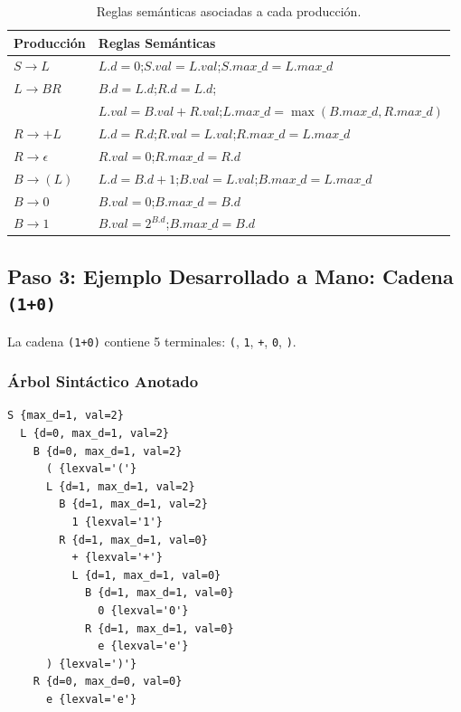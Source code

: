 \documentclass[11pt,a4paper]{article}
\begin{document}
\begin{table}[h!]
\centering
\begin{tabular}{ll}
\toprule
\textbf{Producción} & \textbf{Reglas Semánticas} \\
\midrule
$S \rightarrow L$ & $L.d = 0$;\quad $S.val = L.val$;\quad $S.max\_d = L.max\_d$ \\
\addlinespace
$L \rightarrow B R$ & $B.d = L.d$;\quad $R.d = L.d$; \\
& $L.val = B.val + R.val$;\quad $L.max\_d = \max(B.max\_d, R.max\_d)$ \\
\addlinespace
$R \rightarrow + L$ & $L.d = R.d$;\quad $R.val = L.val$;\quad $R.max\_d = L.max\_d$ \\
\addlinespace
$R \rightarrow \epsilon$ & $R.val = 0$;\quad $R.max\_d = R.d$ \\
\addlinespace
$B \rightarrow ( L )$ & $L.d = B.d + 1$;\quad $B.val = L.val$;\quad $B.max\_d = L.max\_d$ \\
\addlinespace
$B \rightarrow 0$ & $B.val = 0$;\quad $B.max\_d = B.d$ \\
\addlinespace
$B \rightarrow 1$ & $B.val = 2^{B.d}$;\quad $B.max\_d = B.d$ \\
\bottomrule
\end{tabular}
\caption{Reglas semánticas asociadas a cada producción.}
\end{table}

\subsection{Paso 3: Ejemplo Desarrollado a Mano: Cadena \texttt{(1+0)}}

La cadena \texttt{(1+0)} contiene 5 terminales: \texttt{(}, \texttt{1}, \texttt{+}, \texttt{0}, \texttt{)}.

\subsubsection{Árbol Sintáctico Anotado}
\begin{lstlisting}
S {max_d=1, val=2}
  L {d=0, max_d=1, val=2}
    B {d=0, max_d=1, val=2}
      ( {lexval='('}
      L {d=1, max_d=1, val=2}
        B {d=1, max_d=1, val=2}
          1 {lexval='1'}
        R {d=1, max_d=1, val=0}
          + {lexval='+'}
          L {d=1, max_d=1, val=0}
            B {d=1, max_d=1, val=0}
              0 {lexval='0'}
            R {d=1, max_d=1, val=0}
              e {lexval='e'}
      ) {lexval=')'}
    R {d=0, max_d=0, val=0}
      e {lexval='e'}
\end{lstlisting}
\end{document}
